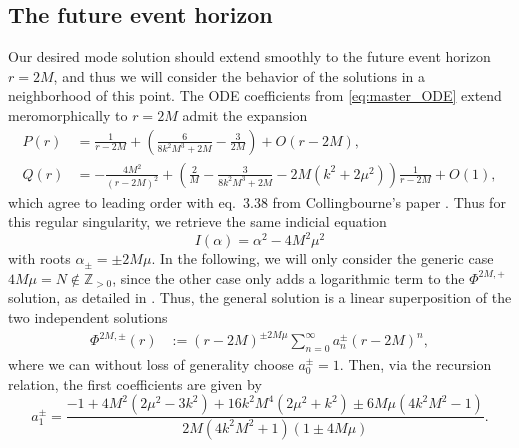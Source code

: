 \documentclass[11pt,aip,jmp,amsmath,amssymb,draft]{revtex4-1}
\begin{document}
\subsection{The future event horizon}
Our desired mode solution should extend smoothly to the future event horizon $r = 2M$, and thus we will consider the behavior of the solutions in a neighborhood of this point.
The ODE coefficients from \cref{eq:master_ODE} extend meromorphically to $r = 2M$ admit the expansion
\begin{align}
    P(r) &= \frac{1}{r-2M} +\left(\frac{6}{8 k^2 M^3+2 M}-\frac{3}{2 M}\right) + O(r-2M), \\
    Q(r) &= -\frac{4M^2}{(r-2M)^2} +\left(\frac{2}{M}-\frac{3}{8 k^2 M^3+2 M}-2M(k^2 + 2\mu^2) \right)\frac{1}{r-2M} + O\left(1\right),
\end{align}
which agree to leading order with eq.~3.38 from Collingbourne's paper \cite{collingbourne2021gregory}. Thus for this regular singularity, we retrieve the same indicial equation
\begin{equation}
    I(\alpha) = \alpha^2 - 4M^2\mu^2
\end{equation}
with roots $\alpha_\pm = \pm 2M\mu$. In the following, we will only consider the generic case $4M\mu = N \not\in \mathbb{Z}_{> 0}$, since the other case only adds a logarithmic term to the $\Phi^{2M,+}$ solution, as detailed in \cite[Appendix~B]{collingbourne2021gregory}.
Thus, the general solution is a linear superposition of the two independent solutions
\begin{align}
    \Phi^{2M,\pm}(r) &:=  (r-2M)^{\pm2M\mu}\sum_{n=0}^\infty a_n^\pm (r-2M)^{n},
\end{align}
where we can without loss of generality choose $a_0^\pm = 1$. Then, via the recursion relation, the first coefficients are given by
\begin{equation}
    a_1^\pm = \frac{-1 + 4M^2 (2\mu^2 - 3k^2) + 16 k^2 M^4(2 \mu^2 + k^2) \pm 6 M \mu \left(4 k^2 M^2-1\right)}{2 M\left(4 k^2 M^2+1\right) (1 \pm 4 M \mu)}.
\end{equation}
\end{document}
